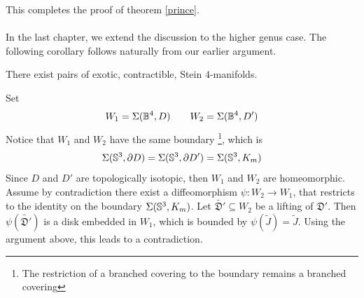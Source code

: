 This completes the proof of theorem \ref{prince}. \\ \\
In the last chapter, we extend the discussion to the higher genus case.
The following corollary follows naturally from our earlier argument.
\begin{cor}\label{giotto}There exist pairs of exotic, contractible, Stein $4$-manifolds.
\end{cor}
\proof
Set $$
W_1 = \Sigma(\mathbb{B}^4, D) \qquad W_2 = \Sigma(\mathbb{B}^4, D')
$$
Notice that $W_1$ and $W_2$ have the same boundary \footnote{The restriction of a branched covering to the boundary remains a branched covering}, which is $$
\Sigma(\mathbb{S}^3, \partial D) = \Sigma(\mathbb{S}^3,\partial D') = \Sigma(\mathbb{S}^3, K_m)
$$
Since $D$ and $D'$ are topologically isotopic, then $W_1$ and $W_2$ are homeomorphic.
Assume by contradiction there exist a diffeomorphism $\psi : W_2 \rightarrow W_1$, that restricts to the identity on the boundary $\Sigma(\mathbb{S}^3, K_m)$.
Let $\tilde{\mathfrak{D'}} \subseteq W_2$ be a lifting of $\mathfrak{D'}$. Then $\psi(\tilde{\mathfrak{D'}})$ is a disk embedded in $W_1$, which is bounded by $\psi(\tilde{J}) = \tilde{J}$. Using the argument above, this leads to a contradiction. 
\endproof
